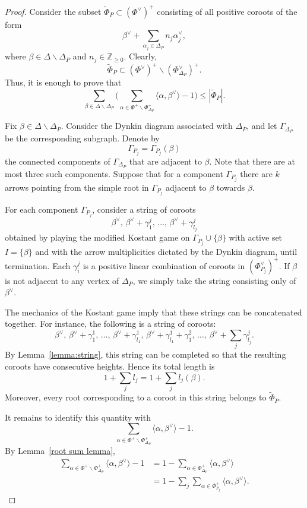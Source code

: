 \documentclass[10pt,a4paper]{amsart}
\begin{document}
\begin{proof}
Consider the subset $\tilde{\Phi}_{P}\subset (\Phi^\vee)^+$ consisting of all positive coroots of the form
\[
\beta^\vee+\sum_{\alpha_j\in \Delta_P} n_j\alpha_j^\vee,
\]
where $\beta\in \Delta \smallsetminus \Delta_P$ and $n_j\in\mathbb Z_{\ge 0}$.
Clearly,
\[
\tilde{\Phi}_{P}\subset (\Phi^\vee)^+\smallsetminus (\Phi_{\Delta_P}^\vee)^+.
\]
Thus, it is enough to prove that
\[
\sum_{\beta\in \Delta \smallsetminus \Delta_P}
\Biggl(
\sum_{\alpha\in \Phi^+\smallsetminus \Phi_{\Delta_P}^+}
\langle \alpha,\beta^\vee\rangle-1
\Biggr)
\le |\tilde{\Phi}_{P}|.
\]

Fix $\beta \in \Delta \smallsetminus \Delta_P$. Consider the Dynkin diagram associated with $\Delta_P$, and let $\Gamma_{\Delta_P}$ be the corresponding subgraph. Denote by
\[
\Gamma_{P_j} = \Gamma_{P_j}(\beta)
\]
the connected components of $\Gamma_{\Delta_P}$ that are adjacent to $\beta$. Note that there are at most three such components. Suppose that for a component $\Gamma_{P_j}$ there are $k$ arrows pointing from the simple root in $\Gamma_{P_j}$ adjacent to $\beta$ towards $\beta$.

For each component $\Gamma_{P_j}$, consider a string of coroots
\[
\beta^\vee,\,
\beta^\vee+\gamma_1^j,\,
\ldots,\,
\beta^\vee+\gamma_{l_j}^j
\]
obtained by playing the modified Kostant game on $\Gamma_{P_j}\cup\{\beta\}$ with active set $I=\{\beta\}$ and with the arrow multiplicities dictated by the Dynkin diagram, until termination. Each $\gamma_i^j$ is a positive linear combination of coroots in $(\Phi_{P_j}^\vee)^+$.
If $\beta$ is not adjacent to any vertex of $\Delta_P$, we simply take the string consisting only of $\beta^\vee$.

The mechanics of the Kostant game imply that these strings can be concatenated together. For instance, the following is a string of coroots:
\[
\beta^\vee,\,
\beta^\vee+\gamma_1^1,\,
\ldots,\,
\beta^\vee+\gamma_{l_1}^1,\,
\beta^\vee+\gamma_{l_1}^1+\gamma_1^2,\,
\ldots,\,
\beta^\vee+\sum_j\gamma_{l_j}^j.
\]
By Lemma~\ref{lemma:string}, this string can be completed so that the resulting coroots have consecutive heights. Hence its total length is
\[
1+\sum_j l_j
=1+\sum_j l_j(\beta).
\]
Moreover, every root corresponding to a coroot in this string belongs to $\tilde{\Phi}_{P}$.

It remains to identify this quantity with
\[
\sum_{\alpha\in \Phi^+\smallsetminus \Phi_{\Delta_P}^+}
\langle \alpha,\beta^\vee\rangle-1.
\]
By Lemma~\ref{root sum lemma},
\begin{align*}
\sum_{\alpha\in \Phi^+\smallsetminus \Phi_{\Delta_P}^+}
\langle \alpha,\beta^\vee\rangle-1
&=
1-\sum_{\alpha\in \Phi_{\Delta_P}^+}\langle \alpha,\beta^\vee\rangle \\
&=
1-\sum_j
\sum_{\alpha\in \Phi_{P_j}^+}\langle \alpha,\beta^\vee\rangle.
\end{align*}


\end{proof}
\end{document}
